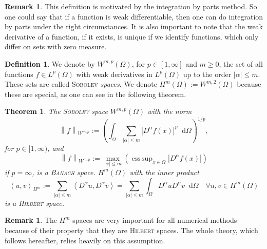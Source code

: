 \documentclass[12pt,a4paper,twoside, open=right]{scrreprt}
\theoremstyle{definition}
\newtheorem{rem}[auf]{Remark}
\newtheorem{defn}[auf]{Definition}
\theoremstyle{plain}
\newtheorem{sa}[auf]{Theorem}
\DeclareMathOperator*{\esssup}{ess\,sup} %
\newcommand{\abs}[1]{\left\vert #1\right\vert}
\newcommand{\dotp}[2]{\left\langle #1,#2\right\rangle}
\newcommand{\norm}[1]{\left\lVert#1\right\rVert}
\newcommand{\D}{\mathop{}\!\mathrm{d}}
\begin{document}
\begin{rem}
    This definition is motivated by the integration by parts method. So one could say that if a function is weak differentiable, then one can do integration by parts under the right circumstances. It is also important to note that the weak derivative of a function, if it exists, is unique if we identify functions, which only differ on sets with zero measure.
\end{rem}
\begin{defn}
    We denote by $W^{m,p}(\Omega)$, for $p\in[1,\infty]$ and $m\ge 0$, the set of all functions $f\in L^p(\Omega)$ with weak derivatives in $L^p(\Omega)$ up to the order $\abs{\alpha}\le m$. These sets are called \textsc{Sobolev} \emph{spaces}. We denote $H^m(\Omega):=W^{m,2}(\Omega)$ because these are special, as one can see in the following theorem.
\end{defn}
\begin{sa}
    The \textsc{Sobolev} space $W^{m,p}(\Omega)$ with the norm
    \begin{equation}
        \norm{f}_{W^{m,p}}:=\left(\int_\Omega\sum_{\abs{\alpha}\le m}\abs{D^{\alpha} f(x)}^p\D\Omega\right)^{1/p},
    \end{equation}
    for $p\in[1,\infty)$, and 
    \begin{equation}
        \norm{f}_{W^{m,p}}:=\max_{\abs{\alpha}\le m}\left(\esssup_{x\in\Omega}\abs{D^{\alpha}f(x)}\right)
    \end{equation}
    if $p=\infty$, is a \textsc{Banach} space. $H^m(\Omega)$ with the inner product
    \begin{equation}
        \dotp{u}{v}_{H^m}:=\sum_{\abs{\alpha}\le m}\dotp{D^{\alpha}u}{D^{\alpha}v}=\sum_{\abs{\alpha}\le m}\int_\Omega D^\alpha u D^\alpha v\D\Omega \quad \forall u,v\in H^m(\Omega)
    \end{equation}
    is a \textsc{Hilbert} space.
\end{sa}
\begin{rem}
    The $H^m$ spaces are very important for all numerical methods because of their property that they are \textsc{Hilbert} spaces. The whole theory, which follows hereafter, relies heavily on this assumption.
\end{rem}
\end{document}
